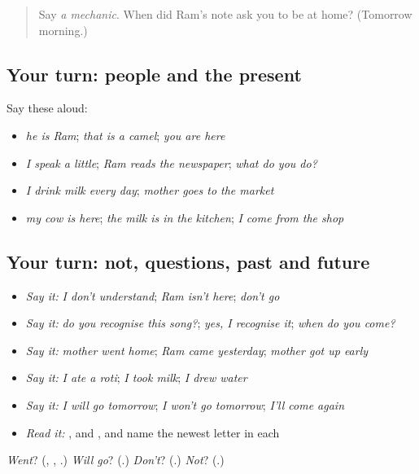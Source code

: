 \label{lesson:MW-R165-second-pass-the-whole-core}



\begin{quote}
Say \emph{a mechanic}. When did Ram's note ask you to be at home? (Tomorrow morning.)
\end{quote}

\subsection*{Your turn: people and the present}
Say these aloud:

\begin{itemize}
\raggedright
  \item \emph{he is Ram}; \emph{that is a camel}; \emph{you are here}
  \item \emph{I speak a little}; \emph{Ram reads the newspaper}; \emph{what do you do?}
  \item \emph{I drink milk every day}; \emph{mother goes to the market}
  \item \emph{my cow is here}; \emph{the milk is in the kitchen}; \emph{I come from the shop}
\end{itemize}

\subsection*{Your turn: not, questions, past and future}
\begin{itemize}
\raggedright
  \item \emph{Say it:} \emph{I don't understand}; \emph{Ram isn't here}; \emph{don't go}
  \item \emph{Say it:} \emph{do you recognise this song?}; \emph{yes, I recognise it}; \emph{when do you come?}
  \item \emph{Say it:} \emph{mother went home}; \emph{Ram came yesterday}; \emph{mother got up early}
  \item \emph{Say it:} \emph{I ate a roti}; \emph{I took milk}; \emph{I drew water}
  \item \emph{Say it:} \emph{I will go tomorrow}; \emph{I won't go tomorrow}; \emph{I'll come again}
  \item \emph{Read it:} \textbf{}, \textbf{} and \textbf{}, and name the newest letter in each
\end{itemize}

\begin{tcolorbox}[breakable,colback=teal!4,colframe=teal!35!black,title={Before you move on}]
\emph{Went}? (\textbf{}, \textbf{}, \textbf{}.) \emph{Will go}? (\textbf{}.) \emph{Don't}? (\textbf{}.) \emph{Not}? (\textbf{}.)
\end{tcolorbox}
